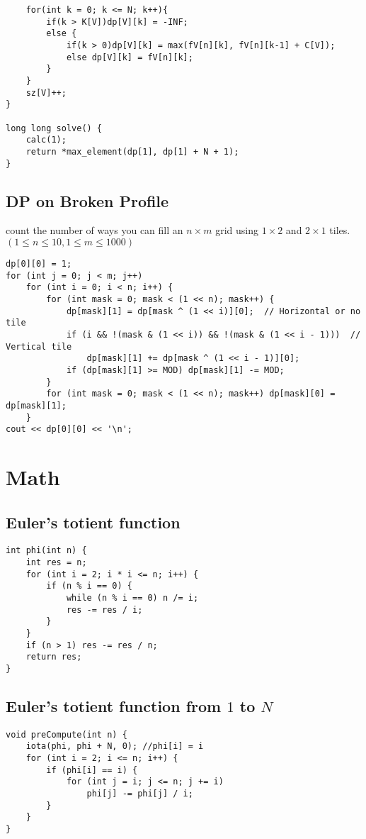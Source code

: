 \documentclass[11pt,a4paper]{article}
\begin{document}
\begin{multicols*}{2}
\begin{lstlisting}
    for(int k = 0; k <= N; k++){
        if(k > K[V])dp[V][k] = -INF;                                
        else {                                                      
            if(k > 0)dp[V][k] = max(fV[n][k], fV[n][k-1] + C[V]);   
            else dp[V][k] = fV[n][k];                               
        }
    }
    sz[V]++;
}

long long solve() {
    calc(1);
    return *max_element(dp[1], dp[1] + N + 1);
}
\end{lstlisting}

\subsection{DP on Broken Profile}
count the number of ways you can fill an $n \times m$ grid using $1 \times 2$ and $2 \times 1$ tiles.
$(1 \le n \le 10, 1 \le m \le 1000)$
\begin{lstlisting}
dp[0][0] = 1;
for (int j = 0; j < m; j++)
    for (int i = 0; i < n; i++) {
        for (int mask = 0; mask < (1 << n); mask++) {
            dp[mask][1] = dp[mask ^ (1 << i)][0];  // Horizontal or no tile
            if (i && !(mask & (1 << i)) && !(mask & (1 << i - 1)))  // Vertical tile
                dp[mask][1] += dp[mask ^ (1 << i - 1)][0];
            if (dp[mask][1] >= MOD) dp[mask][1] -= MOD;
        }
        for (int mask = 0; mask < (1 << n); mask++) dp[mask][0] = dp[mask][1];
    }
cout << dp[0][0] << '\n';
\end{lstlisting}

\section{Math}
\subsection{Euler's totient function}
\begin{lstlisting}
int phi(int n) {
    int res = n;
    for (int i = 2; i * i <= n; i++) {
        if (n % i == 0) {
            while (n % i == 0) n /= i;
            res -= res / i;
        }
    }
    if (n > 1) res -= res / n;
    return res;
}
\end{lstlisting}

\subsection{Euler's totient function from $1$ to $N$}
\begin{lstlisting}
void preCompute(int n) {
    iota(phi, phi + N, 0); //phi[i] = i
    for (int i = 2; i <= n; i++) {
        if (phi[i] == i) {
            for (int j = i; j <= n; j += i)
                phi[j] -= phi[j] / i;
        }
    }
}
\end{lstlisting}


\end{multicols*}
\end{document}
